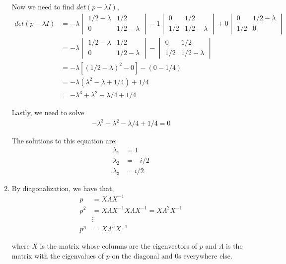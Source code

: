 \documentclass[12pt]{article}
\begin{document}
\begin{enumerate}[label=(\Alph*)]
Now we need to find $det(p - \lambda I)$,
\begin{align*}
det(p - \lambda I) &= -\lambda \begin{vmatrix}
1/2 - \lambda & 1/2\\
0 & 1/2 - \lambda
\end{vmatrix} - 1 \begin{vmatrix}
0 & 1/2\\
1/2 & 1/2 - \lambda
\end{vmatrix} + 0 \begin{vmatrix}
0 & 1/2 - \lambda\\
1/2 & 0
\end{vmatrix}\\
&= -\lambda \begin{vmatrix}
1/2 - \lambda & 1/2\\
0 & 1/2 - \lambda
\end{vmatrix} - \begin{vmatrix}
0 & 1/2\\
1/2 & 1/2 - \lambda
\end{vmatrix}\\
&= -\lambda[(1/2-\lambda)^2 - 0] - (0 - 1/4)\\
&= -\lambda(\lambda^2 - \lambda + 1/4) + 1/4\\
&= -\lambda^3 + \lambda^2 - \lambda/4 + 1/4
\end{align*}

Lastly, we need to solve
\begin{align*}
-\lambda^3 + \lambda^2 - \lambda/4 + 1/4 = 0
\end{align*}

The solutions to this equation are:
\begin{align*}
\lambda_1 &= 1\\
\lambda_2 &= -i/2\\
\lambda_3 &= i/2
\end{align*}

\newpage
\item By diagonalization, we have that,
\begin{align*}
p &= X\Lambda X^{-1}\\
p^2 &= X\Lambda X^{-1} X\Lambda X^{-1} = X\Lambda^2 X^{-1}\\
&\vdots\\
p^n &= X\Lambda^n X^{-1}
\end{align*}

where $X$ is the matrix whose columns are the eigenvectors of $p$ and $\Lambda$ is the matrix with the eigenvalues of $p$ on the diagonal and $0$s everywhere else.\\


\end{enumerate}
\end{document}
